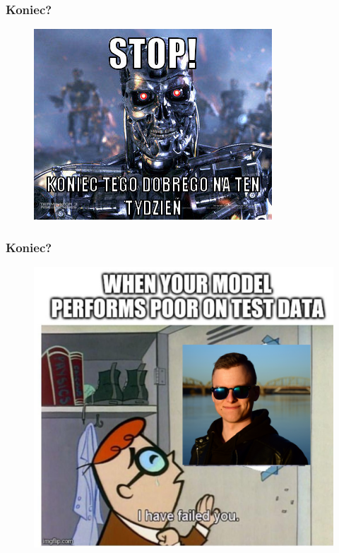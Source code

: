 \documentclass[16pt]{beamer}
\begin{document}
\begin{frame}
\frametitle{Koniec?}
\begin{figure}[ht]
\includegraphics[scale=1]{./terminator.jpeg}
\end{figure}
\end{frame}

\begin{frame}
\frametitle{Koniec?}
\begin{figure}[ht]
\includegraphics[scale=0.2]{./andrew(1).png}
\end{figure}
\end{frame}
\end{document}
